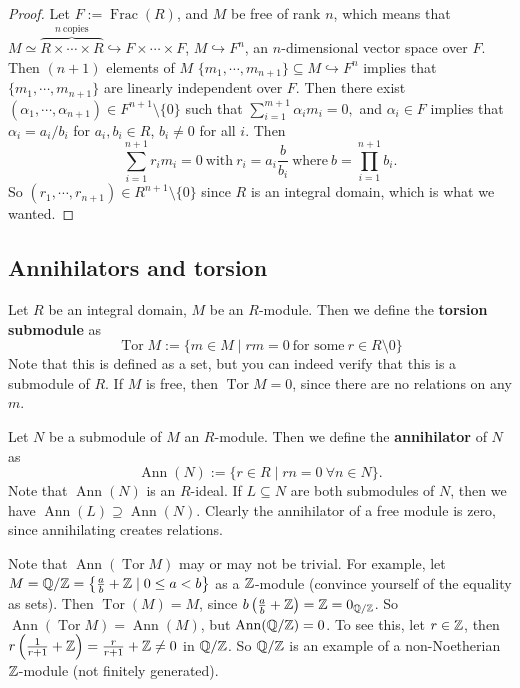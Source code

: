 \begin{proof}
    Let $F:=\operatorname{Frac}(R)$, and $M$ be free of rank $n$, which means that $M\simeq \overset{n \ \text{copies} }{\overbrace{R\times \cdots \times R}}\hookrightarrow F\times \cdots \times F$, $M\hookrightarrow F^n $, an $n$-dimensional vector space over $F$. Then $(n+1)$ elements of $M$ $\{m_1,\cdots ,m_{n+1}\} \subseteq M\hookrightarrow F^n $ implies that $\{m_1,\cdots ,m_{n+1}\} $ are linearly independent over $F$. Then there exist $(\alpha_1,\cdots ,\alpha _{n+1})\in F^{n+1}\setminus \{0\} $ such that $\sum_{i=1}^{m+1} \alpha _i m_i =0,$ and $\alpha _i \in F$ implies that $\alpha _i =a_i  /b_i $ for $a_i ,b_i \in R$, $b_i \neq 0$ for all $i$. Then \[
    \sum_{i=1}^{n+1} r_i m_i =0 \ \text{with} \ r_i =a_i \frac{b}{b_i } \ \text{where} \ b=\prod_{i=1}^{n+1}b_i .
\] So $(r_1,\cdots ,r_{n+1})\in R^{n+1}\setminus \{0\} $ since $R$ is an integral domain, which is what we wanted.
\end{proof}
\subsection{Annihilators and torsion}
\begin{definition}[Torsion]
    Let $R$ be an integral domain, $M$ be an $R$-module. Then we define the \textbf{torsion submodule} as \[
    \operatorname{Tor}M:=\{m\in M \mid rm=0 \ \text{for some} \ r\in R\setminus 0 \} 
    \] Note that this is defined as a set, but you can indeed verify that this is a submodule of $R$. If $M$ is free, then $\operatorname{Tor}M=0$, since there are no relations on any $m$.
\end{definition}
\begin{definition}[Annihilator]
    Let $N$ be a submodule of $M$ an $R$-module. Then we define the \textbf{annihilator} of $N$ as \[
        \operatorname{Ann}(N):=\{r\in R \mid rn=0 \ \forall n\in N\} .
    \] Note that $\operatorname{Ann}(N)$ is an $R$-ideal. If $L\subseteq N$ are both submodules of $N$, then we have $\operatorname{Ann}(L)\supseteq \operatorname{Ann}(N)$. Clearly the annihilator of a free module is zero, since annihilating creates relations. 
\end{definition}
\begin{example}
    Note that $\operatorname{Ann}(\operatorname{Tor}M)$ may or may not be trivial. For example, let $M=\mathbb{Q} /\mathbb{Z}=\left\{\frac{a}{b}+\mathbb{Z} \mid 0\leq a<b\right\} $ as a $\mathbb{Z}$-module (convince yourself of the equality as sets). Then $\operatorname{Tor}(M)=M$, since $b\left( \frac{a}{b} +\mathbb{Z} \right) =\mathbb{Z}=0_{\mathbb{Q} /\mathbb{Z}}$. So $\operatorname{Ann}(\operatorname{Tor}M)=\operatorname{Ann}(M)$, but $\operatorname{Ann}(\mathbb{Q} /\mathbb{Z})=0$. To see this, let $r\in \mathbb{Z}$, then $r\left( \frac{1}{r+1}+\mathbb{Z} \right) =\frac{r}{r+1}+\mathbb{Z}\neq 0$ in $\mathbb{Q} /\mathbb{Z}$. So $\mathbb{Q} /\mathbb{Z}$ is an example of a non-Noetherian $\mathbb{Z}$-module (not finitely generated).
\end{example}

